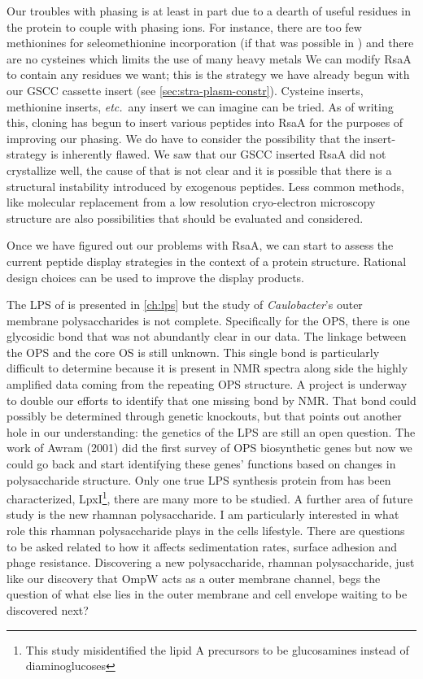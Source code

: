 Our troubles with phasing is at least in part due to a dearth of useful residues in the protein to couple with phasing ions. For instance, there are too few methionines for seleomethionine incorporation (if that was possible in \caulobacter{}) and there are no cysteines which limits the use of many heavy metals We can modify RsaA to contain any residues we want; this is the strategy we have already begun with our GSCC cassette insert (see \cref{sec:stra-plasm-constr}). Cysteine inserts, methionine inserts, \textit{etc.}~any insert we can imagine can be tried. As of writing this, cloning has begun to insert various peptides into RsaA for the purposes of improving our phasing. We do have to consider the possibility that the insert-strategy is inherently flawed. We saw that our GSCC inserted RsaA did not crystallize well, the cause of that is not clear and it is possible that there is a structural instability introduced by exogenous peptides. Less common methods, like molecular replacement from a low resolution cryo-electron microscopy structure are also possibilities that should be evaluated and considered. 

Once we have figured out our problems with RsaA, we can start to assess the current peptide display strategies in the context of a protein  structure. Rational design choices can be used to improve the display products. 

The \ac{LPS} of \caulobacter{} is presented in \cref{ch:lps} but the study of \textit{Caulobacter}'s outer membrane polysaccharides is not complete. Specifically for the \ac{OPS}, there is one glycosidic bond that was not abundantly clear in our data. The linkage between the \ac{OPS} and the core \ac{OS} is still unknown. This  single bond is particularly difficult to determine because it is present in \ac{NMR} spectra along side the highly amplified data coming from the repeating \ac{OPS} structure. A project is underway to double our efforts to identify that one missing bond by \ac{NMR}. That bond could possibly  be determined through genetic knockouts, but that points out another hole in our understanding: the genetics of the \caulobacter{} \ac{LPS} are still an open question. The work of Awram \etal{} (2001) did the first survey of \ac{OPS} biosynthetic genes but now we could go back and start identifying these genes' functions based on changes in polysaccharide structure. Only one true \ac{LPS} synthesis protein from \caulobacter{} has been characterized, LpxI\footnote{This study misidentified the lipid A precursors to be glucosamines instead of diaminoglucoses}, there are many more to be studied. A further area of future study is the new rhamnan polysaccharide. I am particularly interested in what role this rhamnan polysaccharide plays in the cells lifestyle. There are questions to be asked related to how it affects sedimentation rates, surface adhesion and phage resistance. Discovering a new polysaccharide, rhamnan polysaccharide, just like our discovery that OmpW acts as a outer membrane channel, begs the question of what else lies in the outer membrane and cell envelope waiting to be discovered next?
